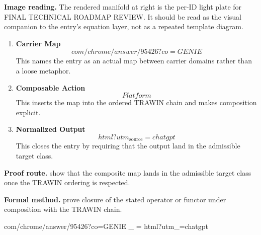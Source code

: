 \begin{samepage}
\noindent\begin{minipage}[t]{0.45\linewidth}
\vspace{0pt}
\raggedright
\scriptsize\textbf{Image reading.} The rendered manifold at right is the per-ID light plate for FINAL TECHNICAL ROADMAP REVIEW. It should be read as the visual companion to the entry's equation layer, not as a repeated template diagram.\par
\end{minipage}\hfill
\begin{minipage}[t]{0.53\linewidth}
\vspace*{-0.10in}
\raggedright
{}
\end{minipage}
\end{samepage}

\clearpage


\begin{enumerate}[leftmargin=1.6em,itemsep=9pt,topsep=6pt]
\item \textbf{Carrier Map}
\[
com/chrome/answer/95426?co=GENIE
\]
This names the entry as an actual map between carrier domains rather than a loose metaphor.

\item \textbf{Composable Action}
\[
Platform%
\]
This inserts the map into the ordered TRAWIN chain and makes composition explicit.

\item \textbf{Normalized Output}
\[
html?utm_{\mathrm{source}}=chatgpt
\]
This closes the entry by requiring that the output land in the admissible target class.
\end{enumerate}

\textbf{Proof route.} show that the composite map lands in the admissible target class once the TRAWIN ordering is respected.

\textbf{Formal method.} prove closure of the stated operator or functor under composition with the TRAWIN chain.

\medskip
{}

\begin{tzpsnapshot}
\end{tzpsnapshot}

\tzpequationlinks
  {com/chrome/answer/95426?co=GENIE}
  {_{} = \cdots}
  {html?utm_{}=chatgpt}
